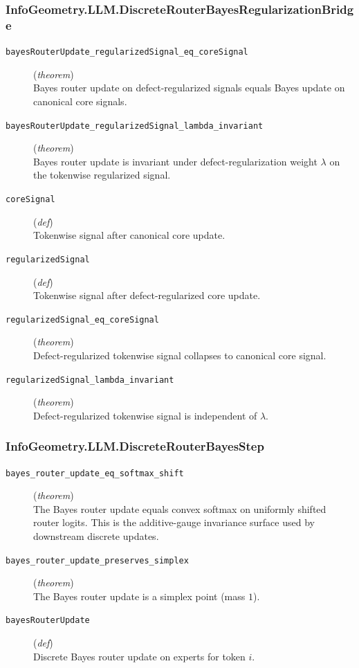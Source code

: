 \documentclass[11pt,a4paper]{article}
\begin{document}
\subsubsection*{InfoGeometry.LLM.DiscreteRouterBayesRegularizationBridge}
\begin{description}
  \item[\texttt{bayesRouterUpdate\_regularizedSignal\_eq\_coreSignal}] (\textit{theorem}) \\ Bayes router update on defect-regularized signals equals Bayes update 
on canonical core signals.
  \item[\texttt{bayesRouterUpdate\_regularizedSignal\_lambda\_invariant}] (\textit{theorem}) \\ Bayes router update is invariant under defect-regularization weight $\lambda $ 
on the tokenwise regularized signal.
  \item[\texttt{coreSignal}] (\textit{def}) \\ Tokenwise signal after canonical core update.
  \item[\texttt{regularizedSignal}] (\textit{def}) \\ Tokenwise signal after defect-regularized core update.
  \item[\texttt{regularizedSignal\_eq\_coreSignal}] (\textit{theorem}) \\ Defect-regularized tokenwise signal collapses to canonical core signal.
  \item[\texttt{regularizedSignal\_lambda\_invariant}] (\textit{theorem}) \\ Defect-regularized tokenwise signal is independent of $\lambda $.
\end{description}
\subsubsection*{InfoGeometry.LLM.DiscreteRouterBayesStep}
\begin{description}
  \item[\texttt{bayes\_router\_update\_eq\_softmax\_shift}] (\textit{theorem}) \\ The Bayes router update equals convex softmax on uniformly shifted router logits. 
This is the additive-gauge invariance surface used by downstream discrete updates.
  \item[\texttt{bayes\_router\_update\_preserves\_simplex}] (\textit{theorem}) \\ The Bayes router update is a simplex point (mass $1$).
  \item[\texttt{bayesRouterUpdate}] (\textit{def}) \\ Discrete Bayes router update on experts for token $i$.
\end{description}
\end{document}
